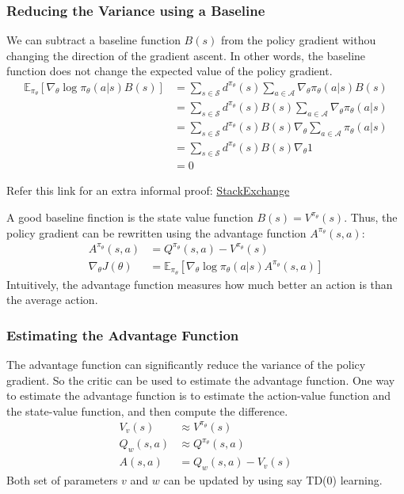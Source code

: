 \subsubsection{Reducing the Variance using a Baseline}
We can subtract a baseline function \(B(s)\) from the policy gradient withou changing the direction 
of the gradient ascent. In other words, the baseline function does not change the expected value
of the policy gradient.
\[
    \begin{aligned}
        \mathbb{E}_{\pi_\theta} \left[ 
            \nabla_\theta \log \pi_\theta(a|s) B(s)
        \right] &= \sum_{s \in \mathcal{S}} d^{\pi_\theta}(s) \sum_{a \in \mathcal{A}}
        \nabla_\theta \pi_\theta(a|s) B(s) \\
        &= \sum_{s \in \mathcal{S}} d^{\pi_\theta}(s) B(s) \sum_{a \in \mathcal{A}}
        \nabla_\theta \pi_\theta(a|s) \\
        &= \sum_{s \in \mathcal{S}} d^{\pi_\theta}(s) B(s) \nabla_\theta \sum_{a \in \mathcal{A}}
        \pi_\theta(a|s) \\
        &= \sum_{s \in \mathcal{S}} d^{\pi_\theta}(s) B(s) \nabla_\theta 1 \\
        &= 0
    \end{aligned}
\]
\begin{note}
    Refer this link for an extra informal proof: 
    \href{https://ai.stackexchange.com/questions/28568/why-adding-a-baseline-
    doesnt-affect-the-policy-gradient}{StackExchange}
\end{note}

A good baseline finction is the state value function \(B(s) = V^{\pi_\theta}(s)\). 
Thus, the policy gradient can be rewritten using the advantage function \(A^{\pi_\theta}(s,a)\):
\[
    \begin{aligned}
        A^{\pi_\theta}(s,a) &= Q^{\pi_\theta}(s,a) - V^{\pi_\theta}(s)\\
        \nabla_\theta J(\theta) &= \mathbb{E}_{\pi_\theta} \left[ 
            \nabla_\theta \log \pi_\theta(a|s) A^{\pi_\theta}(s,a)
        \right]
    \end{aligned}
\]
Intuitively, the advantage function measures how much better an action is than the average action.

\subsubsection{Estimating the Advantage Function}
The advantage function can significantly reduce the variance of the policy gradient. So the
critic can be used to estimate the advantage function. One way to estimate the advantage function
is to estimate the action-value function and the state-value function, and then compute the difference.
\[
\begin{aligned}
    V_v(s) &\approx V^{\pi_\theta}(s) \\
    Q_w(s,a) &\approx Q^{\pi_\theta}(s,a) \\
    A(s,a) &= Q_w(s,a) - V_v(s)
\end{aligned}
\]
Both set of parameters \(v\) and \(w\) can be updated by using say TD(0) learning.


